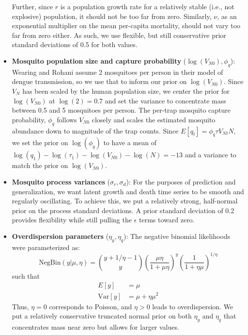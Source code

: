 \documentclass[12pt,letterpaper]{article}
\begin{document}
\begin{itemize}
Further, since $r$ is a population growth rate for a relatively stable (i.e., not explosive) population, it should not be too far from zero.
Similarly, $\nu$, as an exponential multiplier on the mean per-capita mortality, should not vary too far from zero either.
As such, we use flexible, but still conservative prior standard deviations of 0.5 for both values.  
\\
\item \textbf{Mosquito population size and capture probability} ($\log(V_{N0}), \phi_q$): Wearing and Rohani \cite{Wearing2006} assume 2 mosquitoes per person in their model of dengue transmission, so we use that to inform our prior on $\log(V_{N0})$.
Since $V_{N}$ has been scaled by the human population size, we center the prior for $\log(V_{N0})$ at $\log(2) = 0.7$ and set the variance to concentrate mass between 0.5 and 5 mosquitoes per person.
The per-trap mosquito capture probability, $\phi_q$ follows $V_{N0}$ closely and scales the estimated mosquito abundance down to magnitude of the trap counts.
Since $ E[q_t] = \phi_q \tau V_{Nt} N$, we set the prior on $\log(\phi_q)$ to have a mean of $\log(q_1) - \log(\tau_1) - \log(V_{N0}) - \log(N) = -13$ and a variance to match the prior on $\log(V_{N0})$.
\\
\item \textbf{Mosquito process variances} ($\sigma_r, \sigma_d$): For the purposes of prediction and generalization, we want latent growth and death time series to be smooth and regularly oscillating.
To achieve this, we put a relatively strong, half-normal prior on the process standard deviations.
A prior standard deviation of 0.2 provides flexibility while still pulling the $\epsilon$ terms toward zero.
\\
\item \textbf{Overdispersion parameters} ($\eta_y, \eta_q$): The negative binomial likelihoods were parameterized as:
\begin{equation}
\text{NegBin}(y | \mu, \eta) = {y + 1/\eta -1 \choose y}\left(\frac{\mu\eta}{1 + \mu\eta}\right)^y\left(\frac{1}{1+\eta\mu}\right)^{1/\eta}
\end{equation}
such that
\begin{align}
E[y] & = \mu\\
\text{Var}[y] &= \mu + \eta\mu^2
\end{align}
Thus, $\eta = 0$ corresponds to Poisson, and $\eta > 0$ leads to overdispersion.
We put a relatively conservative truncated normal prior on both $\eta_y$ and $\eta_q$ that concentrates mass near zero but allows for larger values.
\end{itemize}
\end{document}
